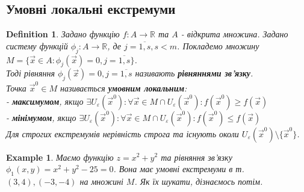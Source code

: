 \documentclass[a4paper, 10pt]{article}
\def\departial#1#2{\dfrac{\partial {#1}}{\partial {#2}}}
\theoremstyle{theoremdd}
\theoremstyle{theoremdd}
\newtheorem{definition}[theorem]{Definition}
\theoremstyle{theoremdd}
\theoremstyle{theoremdd}
\newtheorem{example}[theorem]{Example}
\theoremstyle{theoremdd}
\theoremstyle{theoremdd}
\theoremstyle{theoremdd}
\theoremstyle{theoremdd}
\begin{document}
\subsection{Умовні локальні екстремуми}
\begin{definition}
Задано функцію $f: A \to \mathbb{R}$ та $A$ - відкрита множина. Задано систему функцій $\phi_j: A \to \mathbb{R}$, де $j = \overline{1,s}, s < m$. Покладемо множину $M = \{\vec{x} \in A: \phi_j(\vec{x}) = 0, j = \overline{1,s} \}$.\\

Тоді рівняння $\phi_j(\vec{x}) = 0, j=\overline{1,s}$ називають \textbf{рівняннями зв'язку}.\\
Точка $\vec{x}^0 \in M$ називається \textbf{умовним локальним}:\\
- \textbf{максимумом}, якщо $\exists U_{\varepsilon}(\vec{x}^0): \forall \vec{x} \in M \cap U_{\varepsilon}(\vec{x}^0): f(\vec{x}^0) \geq f(\vec{x})$ \\
- \textbf{мінімумом}, якщо $\exists U_{\varepsilon}(\vec{x}^0): \forall \vec{x} \in M \cap U_{\varepsilon}(\vec{x}^0): f(\vec{x}^0) \leq f(\vec{x})$\\
Для строгих екстремумів нерівність строга та існують околи $U_\varepsilon (\vec{x}^0) \setminus \{\vec{x}^0\}$.
\end{definition}

\begin{example}
Маємо функцію $z = x^2+y^2$ та рівняння зв'язку $\phi_1(x,y) = x^2+y^2-25=0$. Вона має умовні екстремуми в т. $(3,4), (-3,-4)$ на множині $M$. Як їх шукати, дізнаємось потім.
\end{example}
\end{document}
